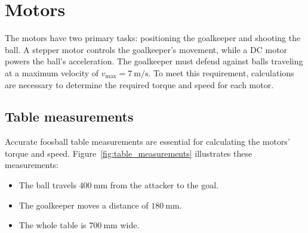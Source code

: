 \newpage


\section{Motors}\label{sec:motors}
The motors have two primary tasks: positioning the goalkeeper and shooting the ball.
A stepper motor controls the goalkeeper's movement, while a DC motor powers the ball's acceleration.
The goalkeeper must defend against balls traveling at a maximum velocity of $v_{\text{max}} = \qty[per-mode=symbol]{7}{\m\per\s}$.
To meet this requirement, calculations are necessary to determine the required torque and speed for each motor.

\subsection{Table measurements}\label{subsec:table_measurements}
Accurate foosball table measurements are essential for calculating the motors' torque and speed.
Figure~\ref{fig:table_measurements} illustrates these measurements:
\begin{itemize}
    \item The ball travels $\qty[per-mode=symbol]{400}{\mm}$ from the attacker to the goal.
    \item The goalkeeper moves a distance of $\qty[per-mode=symbol]{180}{\mm}$.
    \item The whole table is $\qty[per-mode=symbol]{700}{\mm}$ wide.
\end{itemize}

